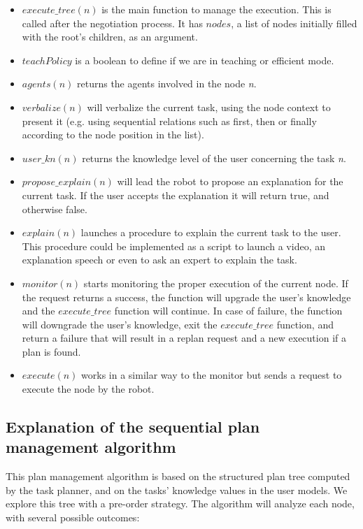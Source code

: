 \begin{itemize}
\item \textit{$execute\_tree(n)$} is the main function to manage the execution. This is called after the negotiation process. It has \textit{$nodes$}, a list of nodes initially filled with the root's children, as an argument.
\item \textit{$teachPolicy$} is a boolean to define if we are in teaching or efficient mode.
\item \textit{$agents(n)$} returns the agents involved in the node \textit{n}.
\item \textit{$verbalize(n)$} will verbalize the current task, using the node context to present it (e.g. using sequential relations such as first, then or finally according to the node position in the list).
\item \textit{$user\_kn(n)$} returns the knowledge level of the user concerning the task \textit{n}.
\item \textit{$propose\_explain(n)$} will lead the robot to propose an explanation for the current task. If the user accepts the explanation it will return true, and otherwise false.
\item \textit{$explain(n)$} launches a procedure to explain the current task to the user. This procedure could be implemented as a script to launch a video, an explanation speech or even to ask an expert to explain the task.
\item \textit{$monitor(n)$} starts monitoring the proper execution of the current node. If the request returns a success, the function will upgrade the user's knowledge and the \textit{$execute\_tree$} function will continue. In case of failure, the function will downgrade the user's knowledge, exit the \textit{$execute\_tree$} function, and return a failure that will result in a replan request and a new execution if a plan is found.
\item \textit{$execute(n)$} works in a similar way to the monitor but sends a request to execute the node by the robot.
\end{itemize}
 
\subsection{Explanation of the sequential plan management algorithm}
This plan management algorithm is based on the structured plan tree computed by the task planner, and on the tasks' knowledge values in the user models. We explore this tree with a pre-order strategy. The algorithm will analyze each node, with several possible outcomes:
